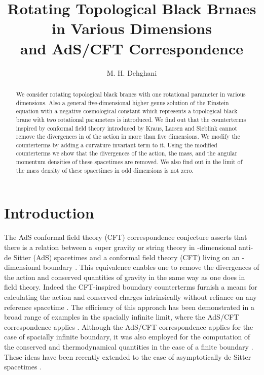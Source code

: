 \documentclass[a4paper,12pt,onecolumn]{revtex4}
\begin{document}
\title{Rotating Topological Black Brnaes in Various Dimensions\\
and AdS/CFT Correspondence}
\author{M. H. Dehghani}
\address{Physics Department and Biruni  Observatory,
         Shiraz University, Shiraz 71454, Iran}
\begin{abstract}
We consider rotating topological black branes with one rotational
parameter in various dimensions. Also a general five-dimensional
higher genus solution of the Einstein equation with a negative
cosmological constant which represents a topological black brane
with two rotational parameters is introduced. We find out that the
counterterms inspired by conformal field theory introduced by
Kraus, Larsen and Sieblink cannot remove the divergences in \coordHE{} of
the action in more than five dimensions. We modify the
counterterms by adding a curvature invariant term to it. Using the
modified counterterms we show that the \coordHE{} divergences of the
action, the mass, and the angular momentum densities of these
spacetimes are removed. We also find out in the limit of \coordHE{} the
mass density of these spacetimes in odd dimensions is not zero.
\end{abstract}

\maketitle



\section{Introduction\label{Intro}}

The AdS conformal field theory (CFT) correspondence conjecture
asserts that there is a relation between a super gravity or string
theory in \coordHE{}-dimensional anti-de Sitter (AdS) spacetimes and
a conformal field theory (CFT) living on an \coordHE{}-dimensional
boundary \cite{Mal1}. This equivalence enables one to remove the
divergences of the action and conserved quantities of gravity in
the same way as one does in field theory. Indeed the CFT-inspired
boundary counterterms furnish a means for calculating the action
and conserved charges intrinsically without reliance on any
reference spacetime \cite{Kls,BK1,Hen}. The efficiency of this
approach has been demonstrated in a broad range of examples in the
spacially infinite limit, where the AdS/CFT correspondence applies
\cite{Emp,Mann,Awad}. Although the AdS/CFT correspondence applies
for the case of spacially infinite boundary, it was also employed
for the computation of the conserved and thermodynamical
quantities in the case of a finite boundary \cite{Deh1}. These
ideas have been recently extended to the case of asymptotically de
Sitter spacetimes \cite{Stro1,Deh2}.
\end{document}
